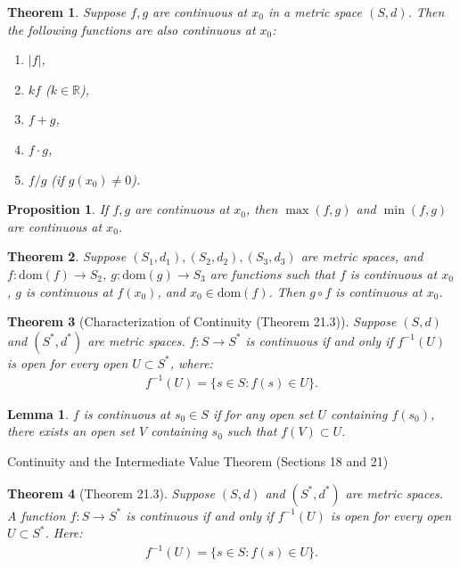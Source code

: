 \documentclass[7pt]{article}
\theoremstyle{definition}
\theoremstyle{plain}
\newtheorem{theorem}{Theorem}
\newtheorem{proposition}{Proposition}
\newtheorem{lemma}{Lemma}
\begin{document}
\begin{theorem}
Suppose $ f, g $ are continuous at $ x_0 $ in a metric space $ (S, d) $. Then the following functions are also continuous at $ x_0 $:
\begin{enumerate}
    \item $ |f| $,
    \item $ kf $ ($ k \in \mathbb{R} $),
    \item $ f + g $,
    \item $ f \cdot g $,
    \item $ f / g $ (if $ g(x_0) \neq 0 $).
\end{enumerate}
\end{theorem}

\begin{proposition}
If $ f, g $ are continuous at $ x_0 $, then $ \max(f, g) $ and $ \min(f, g) $ are continuous at $ x_0 $.
\end{proposition}

\begin{theorem}
Suppose $ (S_1, d_1), (S_2, d_2), (S_3, d_3) $ are metric spaces, and $ f : \text{dom}(f) \to S_2 $, $ g : \text{dom}(g) \to S_3 $ are functions such that $ f $ is continuous at $ x_0 $, $ g $ is continuous at $ f(x_0) $, and $ x_0 \in \text{dom}(f) $. Then $ g \circ f $ is continuous at $ x_0 $.
\end{theorem}

\begin{theorem}[Characterization of Continuity (Theorem 21.3)]
Suppose $ (S, d) $ and $ (S^*, d^*) $ are metric spaces. $ f : S \to S^* $ is continuous if and only if $ f^{-1}(U) $ is open for every open $ U \subset S^* $, where:
\begin{align}
f^{-1}(U) = \{s \in S : f(s) \in U\}.
\end{align}
\end{theorem}

\begin{lemma}
$ f $ is continuous at $ s_0 \in S $ if for any open set $ U $ containing $ f(s_0) $, there exists an open set $ V $ containing $ s_0 $ such that $ f(V) \subset U $.
\end{lemma}
{Continuity and the Intermediate Value Theorem (Sections 18 and 21)}

\begin{theorem}[Theorem 21.3]
Suppose $ (S, d) $ and $ (S^*, d^*) $ are metric spaces. A function $ f : S \to S^* $ is continuous if and only if $ f^{-1}(U) $ is open for every open $ U \subset S^* $. Here:
\begin{align}
f^{-1}(U) = \{s \in S : f(s) \in U\}.
\end{align}
\end{theorem}
\end{document}

